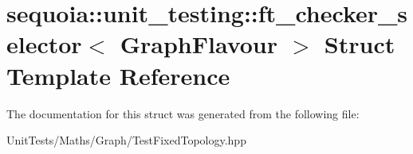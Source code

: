 \hypertarget{structsequoia_1_1unit__testing_1_1ft__checker__selector}{}\section{sequoia\+::unit\+\_\+testing\+::ft\+\_\+checker\+\_\+selector$<$ Graph\+Flavour $>$ Struct Template Reference}
\label{structsequoia_1_1unit__testing_1_1ft__checker__selector}


The documentation for this struct was generated from the following file\+:\begin{DoxyCompactItemize}
\item 
Unit\+Tests/\+Maths/\+Graph/Test\+Fixed\+Topology.\+hpp\end{DoxyCompactItemize}
